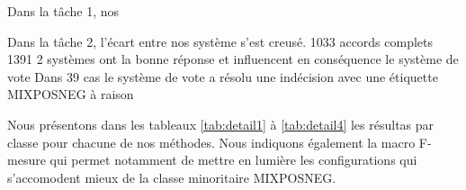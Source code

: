 \label{sec:resultats}

Dans la tâche 1, nos




Dans la tâche 2, l'écart entre nos système s'est creusé.
1033 accords complets
1391 2 systèmes ont la bonne réponse et influencent en conséquence le système de vote
Dans 39 cas le système de vote a résolu une indécision avec une étiquette MIXPOSNEG à raison





Nous présentons dans les tableaux \ref{tab:detail1} à \ref{tab:detail4} les résultas par classe pour chacune de nos méthodes.
 Nous indiquons également la macro F-mesure qui permet notamment de mettre en lumière les configurations qui s'accomodent mieux de la classe minoritaire MIXPOSNEG.
